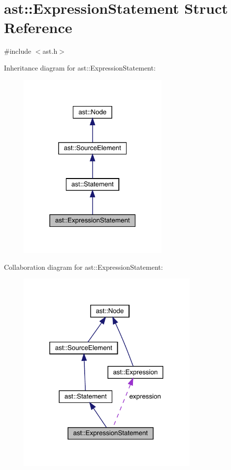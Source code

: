 \hypertarget{structast_1_1_expression_statement}{}\section{ast\+:\+:Expression\+Statement Struct Reference}
\label{structast_1_1_expression_statement}


{\ttfamily \#include $<$ast.\+h$>$}



Inheritance diagram for ast\+:\+:Expression\+Statement\+:
\nopagebreak
\begin{figure}[H]
\begin{center}
\leavevmode
\includegraphics[width=210pt]{structast_1_1_expression_statement__inherit__graph}
\end{center}
\end{figure}


Collaboration diagram for ast\+:\+:Expression\+Statement\+:
\nopagebreak
\begin{figure}[H]
\begin{center}
\leavevmode
\includegraphics[width=253pt]{structast_1_1_expression_statement__coll__graph}
\end{center}
\end{figure}
